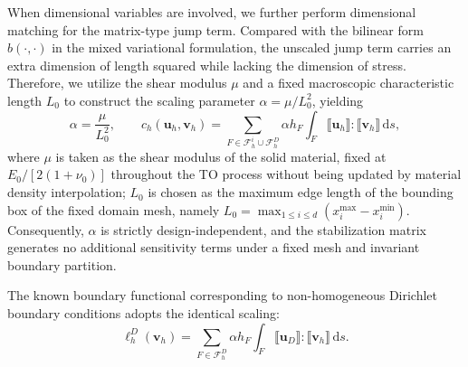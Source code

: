 When dimensional variables are involved, we further perform dimensional matching for the matrix-type jump term. Compared with the bilinear form $b(\cdot,\cdot)$ in the mixed variational formulation, the unscaled jump term carries an extra dimension of length squared while lacking the dimension of stress. Therefore, we utilize the shear modulus $\mu$ and a fixed macroscopic characteristic length $L_0$ to construct the scaling parameter $\alpha = \mu / L_0^2$, yielding
\begin{equation}
\label{eq:scaled_jump_stabilization}
\alpha=\frac{\mu}{L_0^2},\qquad
c_h(\boldsymbol{u}_h,\boldsymbol{v}_h)
=\sum_{F\in\mathcal{F}_h^i\cup\mathcal{F}_h^D}\alpha h_F\int_F \llbracket \boldsymbol{u}_h \rrbracket : \llbracket \boldsymbol{v}_h \rrbracket \,\mathrm{d}s,
\end{equation}
where $\mu$ is taken as the shear modulus of the solid material, fixed at $E_0/[2(1+\nu_0)]$ throughout the TO process without being updated by material density interpolation; $L_0$ is chosen as the maximum edge length of the bounding box of the fixed domain mesh, namely $L_0 = \max_{1\le i\le d}(x_i^{\max} - x_i^{\min})$. Consequently, $\alpha$ is strictly design-independent, and the stabilization matrix generates no additional sensitivity terms under a fixed mesh and invariant boundary partition.

The known boundary functional corresponding to non-homogeneous Dirichlet boundary conditions adopts the identical scaling:
\begin{equation}
\label{eq:dirichlet_stabilization_rhs}
\ell_h^D(\boldsymbol{v}_h)=\sum_{F\in\mathcal{F}_h^D}\alpha h_F\int_F \llbracket \boldsymbol{u}_D \rrbracket : \llbracket \boldsymbol{v}_h \rrbracket \,\mathrm{d}s.
\end{equation}

